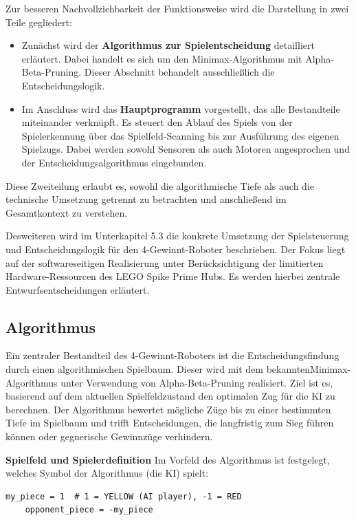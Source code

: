 Zur besseren Nachvollziehbarkeit der Funktionsweise wird die Darstellung in zwei Teile gegliedert:

\begin{itemize}
	\item Zunächst wird der \textbf{Algorithmus zur Spielentscheidung} detailliert erläutert. Dabei handelt es sich um den Minimax-Algorithmus mit Alpha-Beta-Pruning. Dieser Abschnitt behandelt ausschließlich die Entscheidungslogik.
	
	\item Im Anschluss wird das \textbf{Hauptprogramm} vorgestellt, das alle Bestandteile miteinander verknüpft. Es steuert den Ablauf des Spiels von der Spielerkennung über das Spielfeld-Scanning bis zur Ausführung des eigenen Spielzugs. Dabei werden sowohl Sensoren als auch Motoren angesprochen und der Entscheidungsalgorithmus eingebunden.
\end{itemize}

Diese Zweiteilung erlaubt es, sowohl die algorithmische Tiefe als auch die technische Umsetzung getrennt zu betrachten und anschließend im Gesamtkontext zu verstehen.

Desweiteren wird im Unterkapitel 5.3 die konkrete Umsetzung der Spielsteuerung und Entscheidungslogik für den 4-Gewinnt-Roboter beschrieben. Der Fokus liegt auf der softwareseitigen Realisierung unter Berücksichtigung der limitierten Hardware-Ressourcen des LEGO Spike Prime Hubs. Es werden hierbei zentrale Entwurfsentscheidungen erläutert.


\subsection{Algorithmus}

Ein zentraler Bestandteil des 4-Gewinnt-Roboters ist die Entscheidungsfindung durch einen algorithmischen Spielbaum. Dieser wird mit dem bekannten\newline Minimax-Algorithmus unter Verwendung von Alpha-Beta-Pruning realisiert. Ziel ist es, basierend auf dem aktuellen Spielfeldzustand den optimalen Zug für die KI zu berechnen.
Der Algorithmus bewertet mögliche Züge bis zu einer bestimmten Tiefe im Spielbaum und trifft Entscheidungen, die langfristig zum Sieg führen können oder gegnerische Gewinnzüge verhindern.

\textbf{Spielfeld und Spielerdefinition}
Im Vorfeld des Algorithmus ist festgelegt, welches Symbol der Algorithmus (die KI) spielt:

\begin{lstlisting}[style=pythonstyle]
	my_piece = 1  # 1 = YELLOW (AI player), -1 = RED
	opponent_piece = -my_piece
\end{lstlisting}


